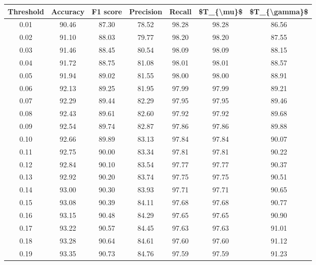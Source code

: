 \begin{tabular}{|c|c|c|c|c|c|c|}
\hline
 Threshold &  Accuracy &  F1 score &  Precision &  Recall &  \$T\_\{\textbackslash mu\}\$ &  \$T\_\{\textbackslash gamma\}\$ \\
\hline
      0.01 &     90.46 &     87.30 &      78.52 &   98.28 &      98.28 &         86.56 \\
      0.02 &     91.10 &     88.03 &      79.77 &   98.20 &      98.20 &         87.55 \\
      0.03 &     91.46 &     88.45 &      80.54 &   98.09 &      98.09 &         88.15 \\
      0.04 &     91.72 &     88.75 &      81.08 &   98.01 &      98.01 &         88.57 \\
      0.05 &     91.94 &     89.02 &      81.55 &   98.00 &      98.00 &         88.91 \\
      0.06 &     92.13 &     89.25 &      81.95 &   97.99 &      97.99 &         89.21 \\
      0.07 &     92.29 &     89.44 &      82.29 &   97.95 &      97.95 &         89.46 \\
      0.08 &     92.43 &     89.61 &      82.60 &   97.92 &      97.92 &         89.68 \\
      0.09 &     92.54 &     89.74 &      82.87 &   97.86 &      97.86 &         89.88 \\
      0.10 &     92.66 &     89.89 &      83.13 &   97.84 &      97.84 &         90.07 \\
      0.11 &     92.75 &     90.00 &      83.34 &   97.81 &      97.81 &         90.22 \\
      0.12 &     92.84 &     90.10 &      83.54 &   97.77 &      97.77 &         90.37 \\
      0.13 &     92.92 &     90.20 &      83.74 &   97.75 &      97.75 &         90.51 \\
      0.14 &     93.00 &     90.30 &      83.93 &   97.71 &      97.71 &         90.65 \\
      0.15 &     93.08 &     90.39 &      84.11 &   97.68 &      97.68 &         90.77 \\
      0.16 &     93.15 &     90.48 &      84.29 &   97.65 &      97.65 &         90.90 \\
      0.17 &     93.22 &     90.57 &      84.45 &   97.63 &      97.63 &         91.01 \\
      0.18 &     93.28 &     90.64 &      84.61 &   97.60 &      97.60 &         91.12 \\
      0.19 &     93.35 &     90.73 &      84.76 &   97.59 &      97.59 &         91.23 \\

\end{tabular}
